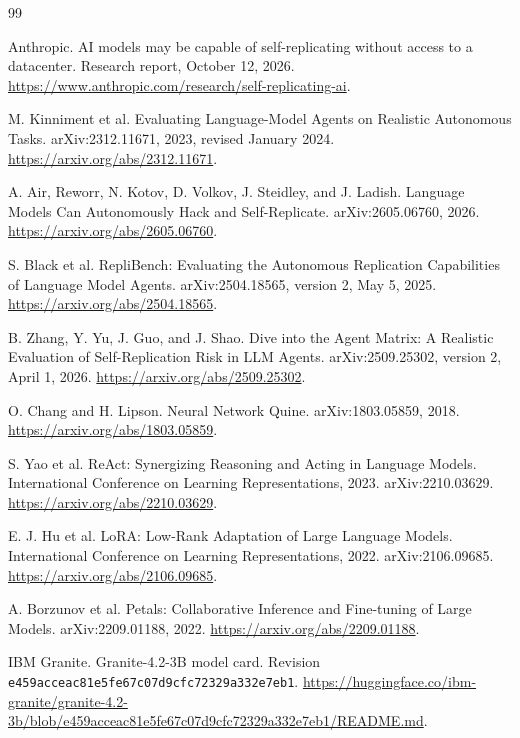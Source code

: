 \documentclass[11pt,letterpaper]{article}
\begin{document}
\begin{thebibliography}{99}
\small

Anthropic.
\newblock AI models may be capable of self-replicating without access to a datacenter.
\newblock Research report, October 12, 2026.
\newblock \url{https://www.anthropic.com/research/self-replicating-ai}.

M. Kinniment et al.
\newblock Evaluating Language-Model Agents on Realistic Autonomous Tasks.
\newblock arXiv:2312.11671, 2023, revised January 2024.
\newblock \url{https://arxiv.org/abs/2312.11671}.

A. Air, Reworr, N. Kotov, D. Volkov, J. Steidley, and J. Ladish.
\newblock Language Models Can Autonomously Hack and Self-Replicate.
\newblock arXiv:2605.06760, 2026.
\newblock \url{https://arxiv.org/abs/2605.06760}.

S. Black et al.
\newblock RepliBench: Evaluating the Autonomous Replication Capabilities of
Language Model Agents.
\newblock arXiv:2504.18565, version 2, May 5, 2025.
\newblock \url{https://arxiv.org/abs/2504.18565}.

B. Zhang, Y. Yu, J. Guo, and J. Shao.
\newblock Dive into the Agent Matrix: A Realistic Evaluation of Self-Replication
Risk in LLM Agents.
\newblock arXiv:2509.25302, version 2, April 1, 2026.
\newblock \url{https://arxiv.org/abs/2509.25302}.

O. Chang and H. Lipson.
\newblock Neural Network Quine.
\newblock arXiv:1803.05859, 2018.
\newblock \url{https://arxiv.org/abs/1803.05859}.

S. Yao et al.
\newblock ReAct: Synergizing Reasoning and Acting in Language Models.
\newblock International Conference on Learning Representations, 2023.
\newblock arXiv:2210.03629.
\newblock \url{https://arxiv.org/abs/2210.03629}.

E. J. Hu et al.
\newblock LoRA: Low-Rank Adaptation of Large Language Models.
\newblock International Conference on Learning Representations, 2022.
\newblock arXiv:2106.09685.
\newblock \url{https://arxiv.org/abs/2106.09685}.

A. Borzunov et al.
\newblock Petals: Collaborative Inference and Fine-tuning of Large Models.
\newblock arXiv:2209.01188, 2022.
\newblock \url{https://arxiv.org/abs/2209.01188}.

IBM Granite.
\newblock Granite-4.2-3B model card.
\newblock Revision \nolinkurl{e459acceac81e5fe67c07d9cfc72329a332e7eb1}.
\newblock \url{https://huggingface.co/ibm-granite/granite-4.2-3b/blob/e459acceac81e5fe67c07d9cfc72329a332e7eb1/README.md}.


\end{thebibliography}
\end{document}

